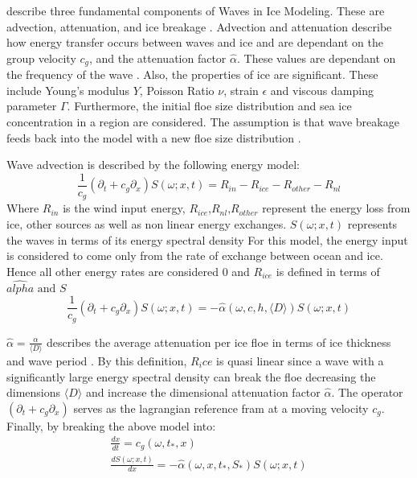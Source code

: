 \textcite{williams2013wave} describe three fundamental components of Waves in Ice Modeling. These are advection, attenuation, and ice breakage \cite{williams2013wave}. Advection and attenuation describe how energy transfer occurs between waves and ice and are dependant on the group velocity $c_g$, and the attenuation factor $\hat{\alpha}$. These values are dependant on the frequency of the wave \cite{williams2013wave}. Also, the properties of ice are significant. These include Young's modulus $Y$, Poisson Ratio $\nu$, strain $\epsilon$ and viscous damping parameter $\Gamma$. Furthermore, the initial floe size distribution and sea ice concentration in a region are considered. The assumption is that wave breakage feeds back into the model with a new floe size distribution \cite{williams2013wave}. \par

Wave advection is described by the following energy model:
\begin{equation}
	\frac{1}{c_g}(\partial_t +c_g\partial_x)S(\omega;x,t) = R_{in}- R_{ice} - R_{other}- R_{nl}
\end{equation}
Where $R_{in}$ is the wind input energy, $R_{ice}$,$R_{nl}$,$R_{other}$ represent the energy loss from ice, other sources as well as non linear energy exchanges. $S(\omega;x,t)$ represents the waves in terms of its energy spectral density \cite{williams2013wave} For this model, the energy input is considered to come only from the rate of exchange between ocean and ice. Hence all other energy rates are considered 0 and $R_{ice}$ is defined in terms of $\hat{alpha} \text{ and } S$
\begin{equation}
	\frac{1}{c_g}(\partial_t +c_g\partial_x)S(\omega;x,t)  = -\hat{\alpha}(\omega,c,h,\langle D \rangle)S(\omega;x,t)
\end{equation}

$\hat{\alpha} = \frac{\alpha}{\langle D \rangle}$ describes the average attenuation per ice floe in terms of ice thickness and wave period \cite{williams2013wave}. By this definition, $R_ice$ is quasi linear \cite{williams2013wave} since a wave with a significantly large energy spectral density can break the floe decreasing the dimensions $\langle D \rangle$ and increase the dimensional attenuation factor $\hat{\alpha}$. The  operator $(\partial_t +c_g\partial_x)$ serves as the lagrangian reference fram at a moving velocity $c_g$. Finally, by breaking the above model into:
\begin{subequations}
	\begin{align}
		\frac{dx}{dt} = c_g(\omega,t_*,x) \label{advect}\\
		\frac{dS(\omega;x,t)}{dx} = -\hat{\alpha}(\omega,x,t_*,S_*)S(\omega;x,t) \label{atten}
	\end{align}
\end{subequations}

